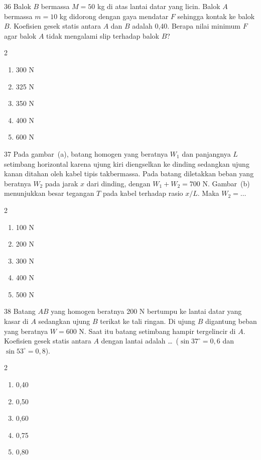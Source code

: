 \documentclass[11pt]{article}
\newenvironment{pilB}{%
  \par\smallskip\begin{multicols}{2}
  \begin{enumerate}[label=(\Alph*),leftmargin=*,itemsep=1pt,topsep=3pt]}%
  {\end{enumerate}\end{multicols}}
\begin{document}
\begin{soal}{36}
Balok $B$ bermassa $M=50$ kg di atas lantai datar yang licin. Balok $A$
bermassa $m=10$ kg didorong dengan gaya mendatar $F$ sehingga kontak ke
balok $B$. Koefisien gesek statis antara $A$ dan $B$ adalah 0,40.
Berapa nilai minimum $F$ agar balok $A$ tidak mengalami slip terhadap
balok $B$?
\begin{pilB}
  \item 300 N \item 325 N \item 350 N \item 400 N \item 600 N
\end{pilB}
\end{soal}

\begin{soal}{37}
Pada gambar~(a), batang homogen yang beratnya $W_1$ dan panjangnya $L$
setimbang horizontal karena ujung kiri diengselkan ke dinding sedangkan
ujung kanan ditahan oleh kabel tipis takbermassa. Pada batang diletakkan
beban yang beratnya $W_2$ pada jarak $x$ dari dinding, dengan
$W_1+W_2=700$ N. Gambar~(b) menunjukkan besar tegangan $T$ pada kabel
terhadap rasio $x/L$. Maka $W_2=\ldots$
\begin{pilB}
  \item 100 N \item 200 N \item 300 N \item 400 N \item 500 N
\end{pilB}
\end{soal}

\begin{soal}{38}
Batang $AB$ yang homogen beratnya 200 N bertumpu ke lantai datar yang
kasar di $A$ sedangkan ujung $B$ terikat ke tali ringan. Di ujung $B$
digantung beban yang beratnya $W=600$ N. Saat itu batang setimbang
hampir tergelincir di $A$. Koefisien gesek statis antara $A$ dengan
lantai adalah \ldots\ ($\sin 37^\circ=0{,}6$ dan $\sin 53^\circ=0{,}8$).
\begin{pilB}
  \item 0,40 \item 0,50 \item 0,60 \item 0,75 \item 0,80
\end{pilB}
\end{soal}
\end{document}
